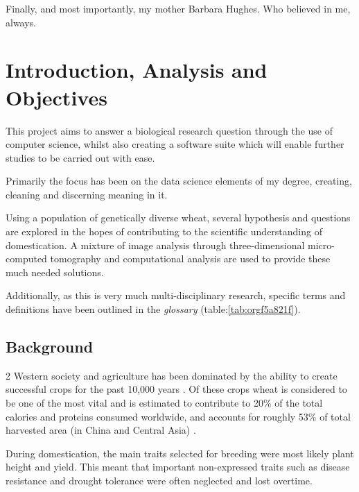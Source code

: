 \documentclass[11pt]{report}
\begin{document}
\vspace{1cm}

Finally, and most importantly, my mother Barbara Hughes. Who believed in me, always.



  \clearpage
  \tableofcontents
  \clearpage
  \listoftables
  \clearpage
  \listoffigures
  \clearpage
  \listofmyequations
  \clearpage
  \listoflistings
  \clearpage

\chapter{Introduction, Analysis and Objectives}
\label{sec:org2c44cb4}

This project aims to answer a biological research question through the use of computer science, whilst also creating a software suite which will enable further studies to be carried out with ease.

Primarily the focus has been on the data science elements of my degree, creating, cleaning and discerning meaning in it.

Using a population of genetically diverse wheat, several hypothesis and questions are explored in the hopes of contributing to the scientific understanding of domestication. A mixture of image analysis through three-dimensional micro-computed tomography and computational analysis are used to provide these much needed solutions.

Additionally, as this is very much multi-disciplinary research, specific terms and definitions have been outlined in the \emph{glossary} (table:\ref{tab:orgf5a821f}).

\section{Background}
\label{sec:org5aa02ae}
2
   Western society and agriculture has been dominated by the ability to create successful crops for the past 10,000 years \cite{Ozkan2002}. Of these crops wheat is considered to be one of the most vital and is estimated to contribute to 20\% of the total calories and proteins consumed worldwide, and accounts for roughly 53\% of total harvested area (in China and Central Asia) \cite{Shiferaw2013}.

During domestication, the main traits selected for breeding were most likely plant height and yield. This meant that important non-expressed traits such as disease resistance and drought tolerance were often neglected and lost overtime.
\end{document}
